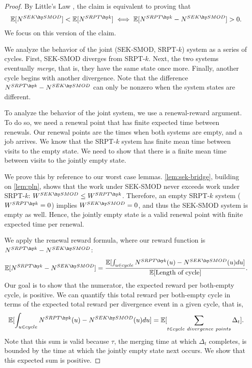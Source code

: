 \documentclass[acmsmall]{acmart}
\newcommand{\E}[1]{\mathbb{E}[#1]}
\begin{document}
\begin{proof}
    By Little's Law \cite{little-et-al2008building}, the claim is equivalent to proving that
    \begin{align*}
        \E{N^{SEK \hy SMOD}} < \E{N^{SRPT \hy k}} \iff \E{N^{SRPT \hy k} - N^{SEK \hy SMOD}} > 0.
    \end{align*}
    We focus on this version of the claim.
    
    We analyze the behavior of the joint (SEK-SMOD, SRPT-$k$) system as a series of cycles.
    First, SEK-SMOD diverges from SRPT-$k$. Next, the two systems eventually \textit{merge}, that is, they have the same state once more. Finally, another cycle begins with another divergence.
    Note that the difference $N^{SRPT \hy k} - N^{SEK \hy SMOD}$ can only be nonzero when the system states are different.

    To analyze the behavior of the joint system, we use a renewal-reward argument.
    To do so, we need a renewal point that has finite expected time between renewals.
    Our renewal points are the times when both systems are empty, and a job arrives.
    We know that the SRPT-$k$ system has finite mean time between visits to the empty state.
    We need to show that there is a finite mean time between visits to the jointly empty state.

    We prove this by reference to our worst case lemmas.
    \cref{lem:sek-bridge}, building on \cref{lem:pln}, shows that the work under SEK-SMOD never exceeds work under SRPT-$k$: $W^{SEK \hy SMOD} \le W^{SRPT\hy k}$. Therefore, an empty SRPT-$k$ system ($W^{SRPT\hy k} = 0$) implies $W^{SEK \hy SMOD} = 0$, and thus the SEK-SMOD system is empty as well. Hence, the jointly empty state is a valid renewal point with finite expected time per renewal.

    We apply the renewal reward formula, where our reward function is $N^{SRPT\hy k} - N^{SEK \hy SMOD}$:
    \begin{align*}
        \E{N^{SRPT \hy k} - N^{SEK \hy SMOD}} = \frac{\E{\int_{u \in cycle} N^{SRPT \hy k}(u) - N^{SEK \hy SMOD}(u) du}}{\E{\text{Length of cycle}}}.
    \end{align*}
    Our goal is to show that the numerator, the expected reward per both-empty cycle, is positive.
    We can quantify this total reward per both-empty cycle in terms of the expected total reward per divergence event in a given cycle, that is,
    \begin{align*}
        \E{\int_{u \in cycle} N^{SRPT \hy k}(u) - N^{SEK \hy SMOD}(u) du}
        = \E{\sum_{t \in cycle\ divergence\ points} \Delta_t}.
    \end{align*}
    Note that this sum is valid because $\tau$, the merging time at which $\Delta_t$ completes,
    is bounded by the time at which the jointly empty state next occurs.
    We show that this expected sum is positive.


\end{proof}
\end{document}
